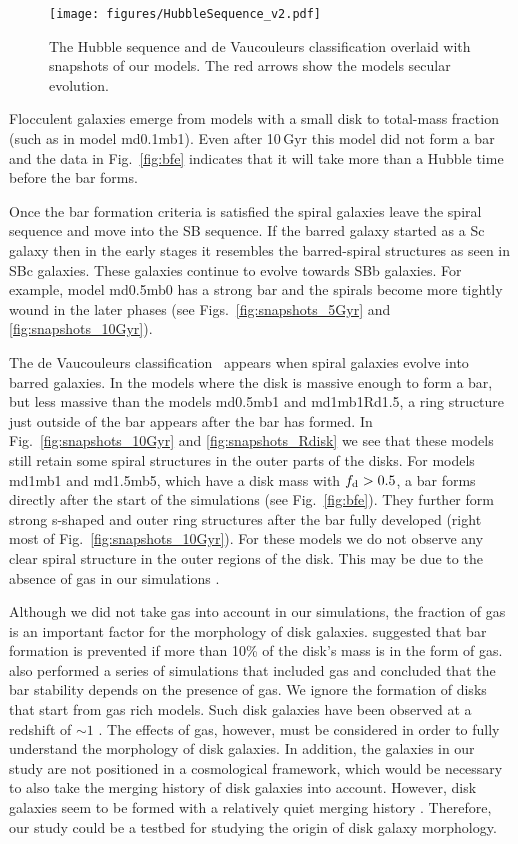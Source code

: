 \begin{figure*}
\texttt{[image: figures/HubbleSequence\_v2.pdf]}
\caption{The Hubble sequence and de Vaucouleurs classification overlaid with snapshots of our models. 
The red arrows show the models secular evolution.\label{fig:Hubble}}
\end{figure*}

Flocculent galaxies emerge
from models with a small disk to total-mass fraction
(such as in model md0.1mb1). 
Even after 10\,Gyr this model did not form a bar and 
the data in Fig.~\ref{fig:bfe} indicates that
it will take more than a Hubble time before the bar forms.

Once the bar formation criteria is satisfied the spiral galaxies leave the 
spiral sequence and move into the SB sequence. If the barred galaxy started as 
a Sc galaxy then in the early stages it resembles the barred-spiral structures 
as seen in SBc galaxies.
These galaxies continue to evolve towards SBb galaxies. For example, model md0.5mb0 has a strong bar and 
the spirals become more tightly wound in the later phases (see Figs.~\ref{fig:snapshots_5Gyr}
and \ref{fig:snapshots_10Gyr}).


The de Vaucouleurs classification~\citep{1959HDP....53..275D} appears 
when spiral galaxies evolve into barred galaxies. In the models 
where the disk is massive enough to form a bar, but less massive than
the models md0.5mb1 and md1mb1Rd1.5, a ring structure just outside 
of the bar appears after the bar has formed. 
In Fig.~\ref{fig:snapshots_10Gyr} and \ref{fig:snapshots_Rdisk} we see 
that these models still retain some 
spiral structures in the outer parts of the disks.
For models md1mb1 and md1.5mb5, which have a disk mass with
$f_{\rm d}>0.5$, a bar forms directly after the start of the 
simulations (see Fig.~\ref{fig:bfe}). They further form strong s-shaped 
and outer ring structures after the bar fully developed 
(right most of Fig.~\ref{fig:snapshots_10Gyr}). For these models we do not 
observe any clear spiral structure in the outer regions of the disk. 
This may be due to the absence of gas in our simulations \citep{2003MNRAS.344..358B}.


Although we did not take gas into account in our simulations, the fraction of gas is an important factor for the morphology of
disk galaxies.
\citet{1993ApJ...414..474S} suggested that bar formation is prevented if more than 10\% of the disk's mass 
is in the form of gas. \citet{2003MNRAS.344..358B} also 
performed a series of simulations that included gas and concluded that the bar stability
depends on the presence of gas.
We ignore the formation of disks that 
start from gas rich models. Such disk galaxies have been observed at a redshift of $\sim 1$
\citep{2017Natur.543..397G}. The effects of gas, however, must be considered in order to fully understand
the morphology of disk galaxies.
In addition, the galaxies in our study are not positioned in a cosmological framework,
which would be necessary to also take the merging history of disk galaxies into account. 
However, disk galaxies seem to be formed with a relatively quiet merging history 
\citep[e. g., ][]{2002NewA....7..155S, 2003ApJ...591..499A}.
Therefore, our study could be a testbed for studying the origin of disk galaxy morphology. 


